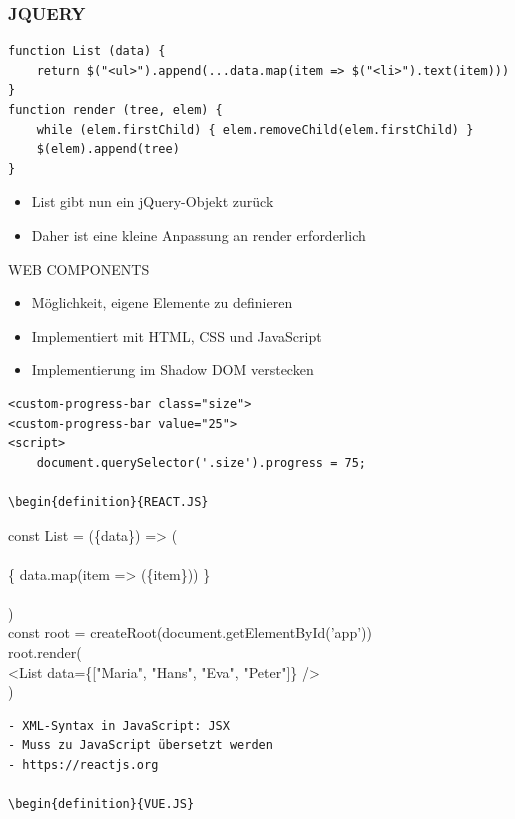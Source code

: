 \subsubsection{JQUERY}

\begin{verbatim}
function List (data) {
    return $("<ul>").append(...data.map(item => $("<li>").text(item)))
}
function render (tree, elem) {
    while (elem.firstChild) { elem.removeChild(elem.firstChild) }
    $(elem).append(tree)
}
\end{verbatim}

\begin{itemize}
  \item List gibt nun ein jQuery-Objekt zurück
  \item Daher ist eine kleine Anpassung an render erforderlich
\end{itemize}

\begin{definition}{WEB COMPONENTS}
\begin{itemize}
  \item Möglichkeit, eigene Elemente zu definieren
  \item Implementiert mit HTML, CSS und JavaScript
  \item Implementierung im Shadow DOM verstecken
\end{itemize}

\begin{verbatim}
<custom-progress-bar class="size">
<custom-progress-bar value="25">
<script>
    document.querySelector('.size').progress = 75;

\begin{definition}{REACT.JS}
\end{verbatim}
\end{definition}

const List = (\{data\}) => (\\
\\
\{ data.map(item => (\{item\})) \}\\
\\
)\\
const root = createRoot(document.getElementById('app'))\\
root.render(\\[0pt]
<List data=\{["Maria", "Hans", "Eva", "Peter"]\} />\\
)

\begin{verbatim}
- XML-Syntax in JavaScript: JSX
- Muss zu JavaScript übersetzt werden
- https://reactjs.org

\begin{definition}{VUE.JS}
\end{verbatim}

